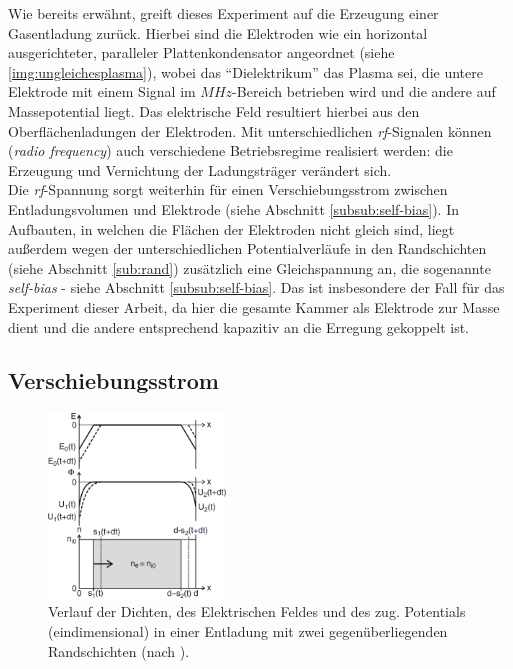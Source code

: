 \documentclass[numbers=noenddot,a4paper,notitlepage,twoside,BCOR15mm]{scrbook}
\newcommand{\tilt}[1]{\textit{#1}}
\begin{document}
			Wie bereits erwähnt, greift dieses Experiment auf die Erzeugung einer Gasentladung zurück. Hierbei sind die Elektroden wie ein horizontal ausgerichteter, paralleler Plattenkondensator angeordnet (siehe \autoref{img:ungleichesplasma}), wobei das "`Dielektrikum"' das Plasma sei, die untere Elektrode mit einem Signal im $\unit{MHz}$-Bereich betrieben wird und die andere auf Massepotential liegt. Das elektrische Feld resultiert hierbei aus den Oberflächenladungen der Elektroden. Mit unterschiedlichen \tilt{rf}-Signalen können (\tilt{radio frequency}) auch verschiedene Betriebsregime realisiert werden: die Erzeugung und Vernichtung der Ladungsträger verändert sich.\\
			Die \tilt{rf}-Spannung sorgt weiterhin für einen Verschiebungsstrom zwischen Entladungsvolumen und Elektrode (siehe Abschnitt \ref{subsub:self-bias}). In Aufbauten, in welchen die Flächen der Elektroden nicht gleich sind, liegt außerdem wegen der unterschiedlichen Potentialverläufe in den Randschichten (siehe Abschnitt \ref{sub:rand}) zusätzlich eine Gleichspannung an, die sogenannte \tilt{self-bias} - siehe Abschnitt \ref{subsub:self-bias}. Das ist insbesondere der Fall für das Experiment dieser Arbeit, da hier die gesamte Kammer als Elektrode zur Masse dient und die andere entsprechend kapazitiv an die Erregung gekoppelt ist.

				\subsection{Verschiebungsstrom} \label{subsub:verschieb}

					\begin{figure}
						\centering
						\includegraphics[width=0.42\textwidth,height=0.5\textwidth]{figs/verschiebpiel.png}
						\caption{Verlauf der Dichten, des Elektrischen Feldes und des zug. Potentials (eindimensional) in einer Entladung mit zwei gegenüberliegenden Randschichten (nach \cite{Piel10}).}
						\label{img:verschieb}
					\end{figure}
\end{document}
